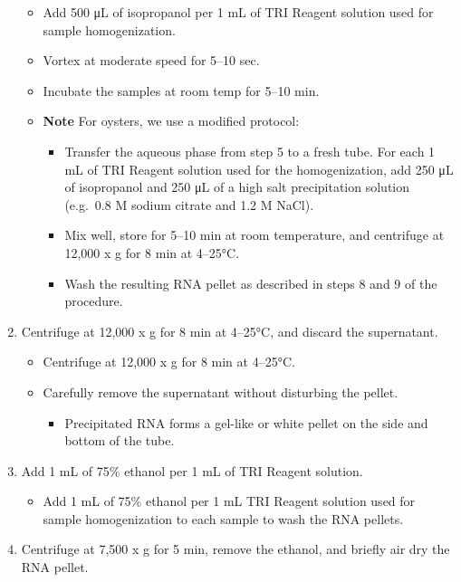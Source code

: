 \documentclass[
  letterpaper,
  DIV=11,
  numbers=noendperiod]{scrreprt}
\providecommand{\tightlist}{%
  \setlength{\itemsep}{0pt}\setlength{\parskip}{0pt}}\usepackage{longtable,booktabs,array}
\begin{document}
\begin{enumerate}
  \begin{itemize}
  \item
    Add 500 μL of isopropanol per 1 mL of TRI Reagent solution used for
    sample homogenization.
  \item
    Vortex at moderate speed for 5--10 sec.
  \item
    Incubate the samples at room temp for 5--10 min.
  \item
    \textbf{Note} For oysters, we use a modified protocol:

    \begin{itemize}
    \item
      Transfer the aqueous phase from step 5 to a fresh tube. For each 1
      mL of TRI Reagent solution used for the homogenization, add 250 μL
      of isopropanol and 250 μL of a high salt precipitation solution
      (e.g.~0.8 M sodium citrate and 1.2 M NaCl).
    \item
      Mix well, store for 5--10 min at room temperature, and centrifuge
      at 12,000 x g for 8 min at 4--25°C.
    \item
      Wash the resulting RNA pellet as described in steps 8 and 9 of the
      procedure.
    \end{itemize}
  \end{itemize}
\item
  Centrifuge at 12,000 x g for 8 min at 4--25°C, and discard the
  supernatant.

  \begin{itemize}
  \item
    Centrifuge at 12,000 x g for 8 min at 4--25°C.
  \item
    Carefully remove the supernatant without disturbing the pellet.

    \begin{itemize}
    \tightlist
    \item
      Precipitated RNA forms a gel-like or white pellet on the side and
      bottom of the tube.
    \end{itemize}
  \end{itemize}
\item
  Add 1 mL of 75\% ethanol per 1 mL of TRI Reagent solution.

  \begin{itemize}
  \tightlist
  \item
    Add 1 mL of 75\% ethanol per 1 mL TRI Reagent solution used for
    sample homogenization to each sample to wash the RNA pellets.
  \end{itemize}
\item
  Centrifuge at 7,500 x g for 5 min, remove the ethanol, and briefly air
  dry the RNA pellet.


\end{enumerate}
\end{document}

